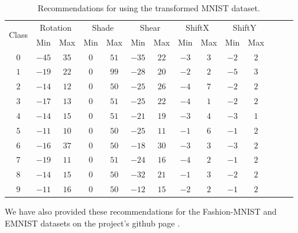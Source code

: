 \begin{center}
 \begin{table}[H]
  \centering
    \begin{tabular}{|c|c|c|c|c|c|c|c|c|c|c|c|c|c|}
    \hline
     \multirow{2}{*}{Class} & \multicolumn{2}{c|}{Rotation} & \multicolumn{2}{c|}{Shade} & \multicolumn{2}{c|}{Shear} & \multicolumn{2}{c|}{ShiftX} & \multicolumn{2}{c|}{ShiftY} \\\cline{2-11} 
     & Min & Max & Min & Max & Min & Max & Min & Max & Min & Max \\
     \hline
    $0$ & $-45$ & $35$ & $0$ & $51$ & $-35$ & $22$ & $-3$ & $3$ & $-2$ & $2$  \\
    $1$ & $-19$ & $22$ & $0$ & $99$ & $-28$ & $20$ & $-2$ & $2$ & $-5$ & $3$  \\
    $2$ & $-14$ & $12$ & $0$ & $50$ & $-25$ & $26$ & $-4$ & $7$ & $-2$ & $2$  \\
    $3$ & $-17$ & $13$ & $0$ & $51$ & $-25$ & $22$ & $-4$ & $1$ & $-2$ & $2$  \\
    $4$ & $-14$ & $15$ & $0$ & $51$ & $-21$ & $19$ & $-3$ & $4$ & $-3$ & $1$  \\
    $5$ & $-11$ & $10$ & $0$ & $50$ & $-25$ & $11$ & $-1$ & $6$ & $-1$ & $2$  \\
    $6$ & $-16$ & $37$ & $0$ & $50$ & $-18$ & $30$ & $-3$ & $3$ & $-3$ & $2$  \\
    $7$ & $-19$ & $11$ & $0$ & $51$ & $-24$ & $16$ & $-4$ & $2$ & $-1$ & $2$  \\
    $8$ & $-14$ & $15$ & $0$ & $50$ & $-32$ & $21$ & $-1$ & $3$ & $-2$ & $2$  \\
    $9$ & $-11$ & $16$ & $0$ & $50$ & $-12$ & $15$ & $-2$ & $2$ & $-1$ & $2$  \\
    \hline
    \end{tabular}
    \caption{Recommendations for using the transformed MNIST dataset.}
    \label{tbl:indexrecommendations}
   \end{table}   
\end{center}
We have also provided these recommendations for the Fashion-MNIST and EMNIST datasets on the project's github page \cite{abhishek2020}.
